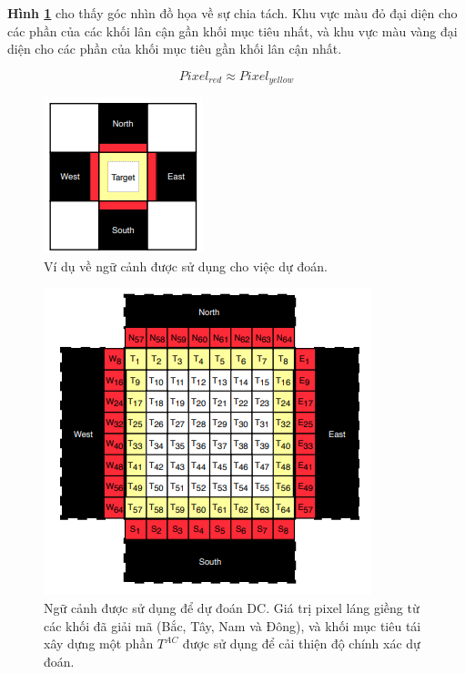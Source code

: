 \textbf{Hình \ref{fig:chap2-example-context}} cho thấy góc nhìn đồ họa về sự chia tách. Khu vực màu đỏ đại diện cho các phần của các khối lân cận gần khối mục tiêu nhất, và khu vực màu vàng đại diện cho các phần của khối mục tiêu gần khối lân cận nhất. 

\begin{equation}
\label{eq:chap2-pixel-red-yl}
Pixel_{red} \approx Pixel_{yellow}
\end{equation}

\begin{figure}
    \centering
    \includegraphics{graphics/chapter-2/chap2-example-context.png}
    \caption{Ví dụ về ngữ cảnh được sử dụng cho việc dự đoán.}
    \label{fig:chap2-example-context}
\end{figure}

\begin{figure}
    \centering
    \includegraphics[scale=0.7]{graphics/chapter-2/chap2-example-context-predict-dc.png}
    \caption{Ngữ cảnh được sử dụng để dự đoán DC. Giá trị pixel láng giềng từ các khối đã giải mã (Bắc, Tây, Nam và Đông), và khối mục tiêu tái xây dựng một phần $T^{AC}$ được sử dụng để cải thiện độ chính xác dự đoán.}
    \label{fig:chap2-example-context-predict-dc}
\end{figure}

